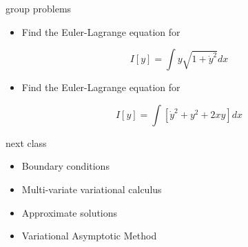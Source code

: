 \documentclass[
  letterpaper,
  ignorenonframetext,
  aspectratio=43,
  handout,
  12pt]{beamer}
\providecommand{\tightlist}{%
  \setlength{\itemsep}{0pt}\setlength{\parskip}{0pt}}
\providecommand{\tightlist}{%
\setlength{\itemsep}{0pt}\setlength{\parskip}{0pt}}
\begin{document}
\begin{frame}{group problems}
\protect\hypertarget{group-problems}{}
\begin{itemize}
\tightlist
\item
  Find the Euler-Lagrange equation for
\end{itemize}

\[I[y] = \int y\sqrt{1+\dot{y}^2} dx\]

\begin{itemize}
\tightlist
\item
  Find the Euler-Lagrange equation for
\end{itemize}

\[I[y] = \int [\dot{y}^2 + y^2 + 2xy] dx\]
\end{frame}

\begin{frame}{next class}
\protect\hypertarget{next-class}{}
\begin{itemize}
\tightlist
\item
  Boundary conditions
\item
  Multi-variate variational calculus
\item
  Approximate solutions
\item
  Variational Asymptotic Method
\end{itemize}
\end{frame}
\end{document}

